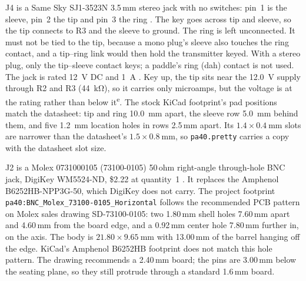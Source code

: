 \documentclass[11pt,letterpaper]{article}
\newcommand{\est}{\textsuperscript{e}}
\begin{document}
J4 is a Same Sky SJ1-3523N 3.5\,mm stereo jack with no switches: pin~1 is the sleeve, pin~2 the tip and pin~3 the ring \cite[p.~2]{sameskySJ1}. The key goes across tip and sleeve, so the tip connects to R3 and the sleeve to ground. The ring is left unconnected. It must not be tied to the tip, because a mono plug's sleeve also touches the ring contact, and a tip--ring link would then hold the transmitter keyed. With a stereo plug, only the tip--sleeve contact keys; a paddle's ring (dah) contact is not used. The jack is rated \SI{12}{\volt} DC and \SI{1}{\ampere} \cite{sameskySJ1}. Key up, the tip sits near the \SI{12.0}{\volt} supply through R2 and R3 (\SI{44}{\kilo\ohm}), so it carries only microamps, but the voltage is at the rating rather than below it\est. The stock KiCad footprint's pad positions match the datasheet: tip and ring \SI{10.0}{\milli\meter} apart, the sleeve row \SI{5.0}{\milli\meter} behind them, and five \SI{1.2}{\milli\meter} location holes in rows 2.5\,mm apart. Its $1.4\times\SI{0.4}{\milli\meter}$ slots are narrower than the datasheet's $1.5\times\SI{0.8}{\milli\meter}$, so \texttt{pa40.pretty} carries a copy with the datasheet slot size.

J2 is a Molex 0731000105 (73100-0105) 50\,ohm right-angle through-hole BNC jack, DigiKey WM5524-ND, \$2.22 at quantity~1 \cite{molex73100}. It replaces the Amphenol B6252HB-NPP3G-50, which DigiKey does not carry. The project footprint \texttt{pa40:BNC\_Molex\_73100-0105\_Horizontal} follows the recommended PCB pattern on Molex sales drawing SD-73100-0105: two 1.80\,mm shell holes 7.60\,mm apart and 4.60\,mm from the board edge, and a 0.92\,mm center hole 7.80\,mm further in, on the axis. The body is $21.80\times\SI{9.65}{\milli\meter}$ with 13.00\,mm of the barrel hanging off the edge. KiCad's Amphenol B6252HB footprint does not match this hole pattern. The drawing recommends a 2.40\,mm board; the pins are 3.00\,mm below the seating plane, so they still protrude through a standard 1.6\,mm board.
\end{document}
